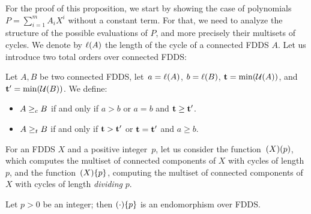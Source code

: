 	
	For the proof of this proposition, we start by showing the case of polynomials $P = \sum_{i=1}^{m} A_i X^i$ without a constant term. 
	For that, we need to analyze the structure of the possible evaluations of $P$, and more precisely their multisets of cycles.
	We denote by $\ell(A)$ the length of the cycle of a connected FDDS $A$.
	Let us introduce two total orders over connected FDDS:
	
	\begin{definition}
	        Let $A,B$ be two connected FDDS, let~$a = \ell(A)$, $b = \ell(B)$, $\tree{t}= \min(\unroll{A})$, and $\tree{t'} = \min(\unroll{B})$.
		We define:	
		\begin{itemize}
			\item $A \ge_{c} B$ if and only if $a > b$ or $a = b$ and $\tree{t} \ge \tree{t'}$.
			\item $A \ge_{t} B$ if and only if $\tree{t} > \tree{t'}$ or $\tree{t} = \tree{t'}$ and $a \ge b$.
		\end{itemize}
	\end{definition}
	
	For an FDDS $X$ and a positive integer~$p$, let us consider the function~$(X)(p)$, which computes the multiset of connected components of $X$ with cycles of length $p$, and the function~$(X)\{p\}$, computing the multiset of connected components of $X$ with cycles of length \emph{dividing} $p$.
	
	\begin{lemma}\label{lemme:closureProduct}
		Let $p > 0$ be an integer; then
		$(\cdot)\{p\}$ is an endomorphism over FDDS. 
	\end{lemma}
	
